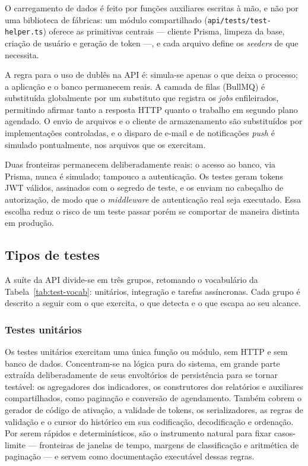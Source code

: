 O carregamento de dados é feito por funções auxiliares escritas à mão, e não por
uma biblioteca de fábricas: um módulo compartilhado
(\texttt{api/tests/test-helper.ts}) oferece as primitivas centrais --- cliente
Prisma, limpeza da base, criação de usuário e geração de token ---, e cada
arquivo define os \textit{seeders} de que necessita.

A regra para o uso de dublês na API é: simula-se apenas o que deixa o processo;
a aplicação e o banco permanecem reais. A camada de filas (BullMQ) é substituída
globalmente por um substituto que registra os \textit{jobs} enfileirados,
permitindo afirmar tanto a resposta HTTP quanto o trabalho em segundo plano
agendado. O envio de arquivos e o cliente de armazenamento são substituídos por
implementações controladas, e o disparo de e-mail e de notificações
\textit{push} é simulado pontualmente, nos arquivos que os exercitam.

Duas fronteiras permanecem deliberadamente reais: o acesso ao banco, via
Prisma, nunca é simulado; tampouco a autenticação. Os testes geram tokens JWT
válidos, assinados com o segredo de teste, e os enviam no cabeçalho de
autorização, de modo que o \textit{middleware} de autenticação real seja
executado. Essa escolha reduz o risco de um teste passar porém se comportar de
maneira distinta em produção.

\subsection{Tipos de testes}\label{sec:test-api-tipos}

A suíte da API divide-se em três grupos, retomando o vocabulário da
Tabela~\ref{tab:test-vocab}: unitários, integração e tarefas assíncronas. Cada
grupo é descrito a seguir com o que exercita, o que detecta e o que escapa ao
seu alcance.

\subsubsection{Testes unitários}

Os testes unitários exercitam uma única função ou módulo, sem HTTP e sem banco
de dados. Concentram-se na lógica pura do sistema, em grande parte extraída
deliberadamente de seus envoltórios de persistência para se tornar testável: os
agregadores dos indicadores, os construtores dos relatórios e auxiliares
compartilhados, como paginação e conversão de agendamento. Também cobrem
o gerador de código de ativação, a validade de tokens, os serializadores, as
regras de validação e o cursor do histórico em sua codificação, decodificação
e ordenação. Por serem rápidos e determinísticos, são o instrumento natural
para fixar casos-limite --- fronteiras de janelas de tempo, margens de
classificação e aritmética de paginação --- e servem como documentação
executável dessas regras.

